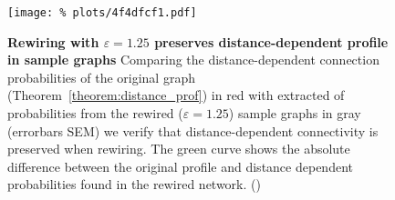 



\begin{figure}[H]
  \centering
  \texttt{[image: \%
    plots/4f4dfcf1.pdf]} 
  \captionsetup{skip=0pt}
  \caption{\textbf{Rewiring with \boldmath$\varepsilon = 1.25$
      preserves distance-dependent profile in sample graphs} Comparing
    the distance-dependent connection probabilities of the original
    graph (Theorem~\ref{theorem:distance_prof}) in red with extracted
    of probabilities from the rewired ($\varepsilon = 1.25$) sample
    graphs in gray (errorbars SEM\protect\footnotemark) we verify that
    distance-dependent connectivity is preserved when rewiring. The
    green curve shows the absolute difference between the original
    profile and distance dependent probabilities found in the rewired
    network. ()}
  \label{fig:rewiring_dst_prf_compare}
\end{figure}

